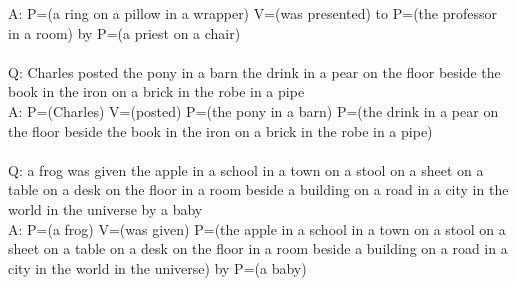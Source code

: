 \documentclass{article} \usepackage{iclr2022_conference,times}
\begin{document}
{A: P=(a ring on a pillow in a wrapper) V=(was presented) to P=(the professor in a room) by P=(a priest on a chair) \\
 \\
Q: Charles posted the pony in a barn the drink in a pear on the floor beside the book in the iron on a brick in the robe in a pipe \\
A: P=(Charles) V=(posted) P=(the pony in a barn) P=(the drink in a pear on the floor beside the book in the iron on a brick in the robe in a pipe) \\
 \\
Q: a frog was given the apple in a school in a town on a stool on a sheet on a table on a desk on the floor in a room beside a building on a road in a city in the world in the universe by a baby \\
A: P=(a frog) V=(was given) P=(the apple in a school in a town on a stool on a sheet on a table on a desk on the floor in a room beside a building on a road in a city in the world in the universe) by P=(a baby)
}
\end{document}
